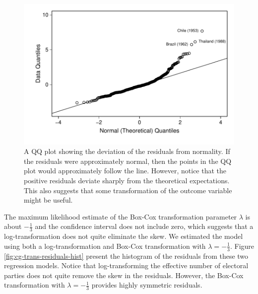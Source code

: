 \documentclass[12pt]{article}
\begin{document}
\begin{figure}[H]
\begin{center}
	\includegraphics[scale = 0.6]{figs/cg-qq-plot.pdf}
\caption{A QQ plot showing the deviation of the residuals from normality. If the residuals were approximately normal, then the points in the QQ plot would approximately follow the line. However, notice that the positive residuals deviate sharply from the theoretical expectations. This also suggests that some transformation of the outcome variable might be useful.}\label{fig:cg-qq-plot}
\end{center}

\end{figure}

The maximum likelihood estimate of the Box-Cox transformation parameter $\lambda$ is about $-\frac{1}{3}$ and the confidence interval does not include zero, which suggests that a log-transformation does not quite eliminate the skew. We estimated the model using both a log-transformation and Box-Cox transformation with $\lambda = -\frac{1}{3}$. Figure \ref{fig:cg-trans-residuals-hist} present the histogram of the residuals from these two regression models. Notice that log-transforming the effective number of electoral parties does not quite remove the skew in the residuals. However, the Box-Cox transformation with $\lambda = -\frac{1}{3}$ provides highly symmetric residuals. 
\end{document}
